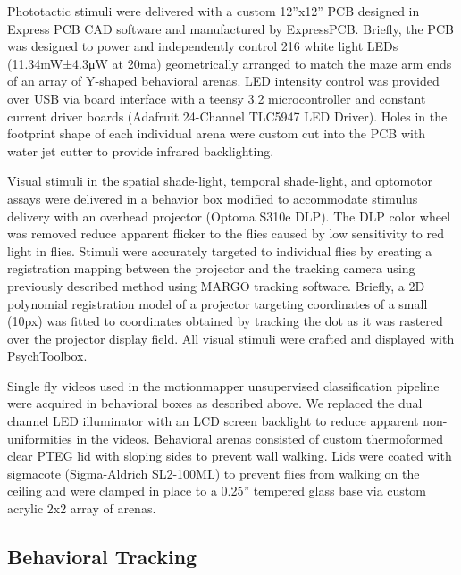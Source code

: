 \documentclass[12pt,letterpaper]{article}
\begin{document}
Phototactic stimuli were delivered with a custom 12”x12” PCB designed in Express PCB CAD software and manufactured by ExpressPCB. Briefly, the PCB was designed to power and independently control 216 white light LEDs (11.34mW±4.3μW at 20ma) geometrically arranged to match the maze arm ends of an array of Y-shaped behavioral arenas. LED intensity control was provided over USB via board interface with a teensy 3.2 microcontroller and constant current driver boards (Adafruit 24-Channel TLC5947 LED Driver). Holes in the footprint shape of each individual arena were custom cut into the PCB with water jet cutter to provide infrared backlighting. 

Visual stimuli in the spatial shade-light, temporal shade-light, and optomotor assays were delivered in a behavior box modified to accommodate stimulus delivery with an overhead projector (Optoma S310e DLP). The DLP color wheel was removed reduce apparent flicker to the flies caused by low sensitivity to red light in flies. Stimuli were accurately targeted to individual flies by creating a registration mapping between the projector and the tracking camera using previously described method using MARGO tracking software. Briefly, a 2D polynomial registration model of a projector targeting coordinates of a small (10px) was fitted to coordinates obtained by tracking the dot as it was rastered over the projector display field. All visual stimuli were crafted and displayed with PsychToolbox.

Single fly videos used in the motionmapper unsupervised classification pipeline were acquired in behavioral boxes as described above. We replaced the dual channel LED illuminator with an LCD screen backlight to reduce apparent non-uniformities in the videos. Behavioral arenas consisted of custom thermoformed clear PTEG lid with sloping sides to prevent wall walking. Lids were coated with sigmacote (Sigma-Aldrich SL2-100ML) to prevent flies from walking on the ceiling and were clamped in place to a 0.25” tempered glass base via custom acrylic 2x2 array of arenas.

\subsection{Behavioral Tracking}
\end{document}
